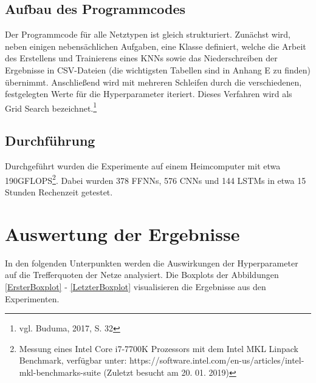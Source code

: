 \documentclass[a4paper,12pt,ngerman,oneside]{scrreprt}	%
\newcommand{\fundamentals}[1]{vgl. Buduma, 2017, S. {#1}}
\begin{document}
			\subsection{Aufbau des Programmcodes}
			Der Programmcode für alle Netztypen ist gleich strukturiert. Zunächst wird, neben einigen nebensächlichen Aufgaben, eine Klasse definiert, welche die Arbeit des Erstellens und Trainierens eines KNNs sowie das Niederschreiben der Ergebnisse in CSV-Dateien (die wichtigsten Tabellen sind in Anhang E zu finden) übernimmt. Anschließend wird mit mehreren Schleifen durch die verschiedenen, festgelegten Werte für die Hyperparameter iteriert. Dieses Verfahren wird als Grid Search bezeichnet.\footnote{\fundamentals{32}} 
			\subsection{Durchführung}
			Durchgeführt wurden die Experimente auf einem Heimcomputer mit etwa 190\break GFLOPS\footnote{Messung eines Intel Core i7-7700K Prozessors mit dem Intel MKL Linpack Benchmark, verfügbar unter: https://software.intel.com/en-us/articles/intel-mkl-benchmarks-suite (Zuletzt besucht am 20. 01. 2019)}. Dabei wurden 378 FFNNs, 576 CNNs und 144 LSTMs in etwa 15 Stunden Rechenzeit getestet.
			
		\section{Auswertung der Ergebnisse}
			In den folgenden Unterpunkten werden die Auswirkungen der Hyperparameter auf die Trefferquoten der Netze analysiert. Die Boxplots der Abbildungen \ref{ErsterBoxplot} - \ref{LetzterBoxplot} visualisieren die Ergebnisse aus den Experimenten.
\end{document}
